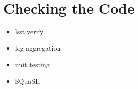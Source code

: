 \section{Checking the Code}
\begin{itemize}
\item lsst.verify
\item log aggregation
\item unit testing
\item SQuaSH
\end{itemize}
